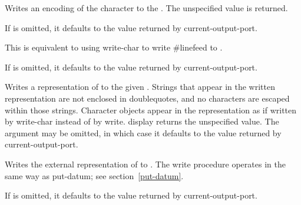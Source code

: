\begin{entry}{%
}

Writes an encoding of the character  to the
. The unspecified value is
returned.

If  is omitted, it defaults to the value returned by
{\cf current-output-port}.
\end{entry}

\begin{entry}{%
}

This is equivalent to using {\cf write-char} to write
{\cf \#\backwhack{}linefeed}
to .

If  is omitted, it defaults to the value returned by
{\cf current-output-port}.
\end{entry}

\begin{entry}{%
}

Writes a representation of  to the given .
Strings that appear in
the written representation are not enclosed in doublequotes, and no
characters are escaped within those strings.  Character objects appear
in the representation as if written by {\cf write-char} instead of by
{\cf write}.  {\cf display} returns the unspecified value.  The
 argument may be omitted, in which case it defaults
to the value returned by {\cf current-output-port}.
\end{entry}

\begin{entry}{%
}

Writes the external representation of  to .
The {\cf write}
procedure operates in the same way as {\cf put-datum}; see
section~\ref{put-datum}.

If  is omitted, it defaults to the value returned by
{\cf current-output-port}.
\end{entry}



